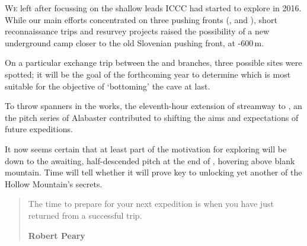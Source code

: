 \newpage
 \thispagestyle{endchapter}
\begin{tcolorbox}
	\vspace{80pt}
	\lettrine{W}{e} left  after focussing on the shallow leads ICCC had started to explore in 2016. While our main efforts concentrated on three pushing fronts (,  and ), short reconnaissance trips and resurvey projects raised the possibility of a new underground camp closer to the old Slovenian pushing front, at -600\,m. 
	
	On a particular exchange trip between the  and  branches, three possible sites were spotted; it will be the goal of the forthcoming year to determine which is most suitable for the objective of `bottoming' the cave at last. 

	To throw spanners in the works, the eleventh-hour extension of  streamway to , an the pitch series of Alabaster contributed to shifting the aims and expectations of future expeditions. 
	
	It now seems certain that at least part of the motivation for exploring  will be down to the awaiting, half-descended pitch at the end of , hovering above blank mountain. Time will tell whether it will prove key to unlocking yet another of the Hollow Mountain's secrets. 
	
	\mydelimiter
	
	\begin{quote} The time to prepare for your next expedition is when you have just returned from a successful trip. 
	
	\raggedleft\normalsize\sffamily\textbf{Robert Peary}\par \end{quote}

\end{tcolorbox}

